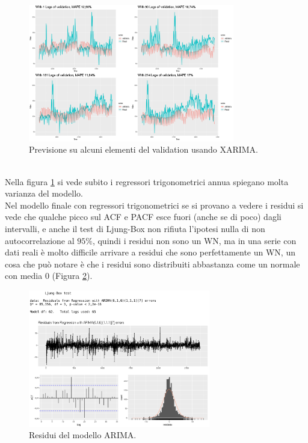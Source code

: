 \documentclass[12pt, onecolumn]{article}
\begin{document}
\begin{figure}[!h]
  \centering
  \includegraphics[width=\linewidth,height=6cm]{imgs/forecast_arima.png}
  \caption{Previsione su alcuni elementi del validation usando XARIMA.}
  \label{fig:XARIMA_pred}
\end{figure}\\
Nella figura \ref{fig:XARIMA_pred} si vede subito i regressori trigonometrici annua spiegano molta varianza del modello.\\
Nel modello finale con regressori trigonometrici se si provano a vedere i residui si vede che qualche picco sul ACF e PACF esce fuori (anche se di poco) dagli intervalli, e anche il test di Ljung-Box non rifiuta l'ipotesi nulla di non autocorrelazione al $95\%$, quindi i residui non sono un WN, ma in una serie con dati reali è molto difficile arrivare a residui che sono perfettamente un WN, un cosa che può notare è che i residui sono distribuiti abbastanza come un normale con media 0 (Figura \ref{fig:res}).
\begin{figure}[!h]
  \centering
  \includegraphics[width=\linewidth,height=6cm]{imgs/arima_res.png}
  \caption{Residui del modello ARIMA.}
  \label{fig:res}
\end{figure}
\end{document}
